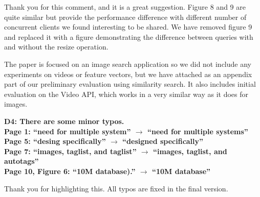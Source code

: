 \documentclass[11pt]{proposalnsf}
\begin{document}
Thank you for this comment, and it is a great suggestion.
Figure 8 and 9 are quite similar but provide the performance difference with different
number of concurrent clients we found interesting to be shared.
We have removed figure 9 and replaced it with a figure
demonstrating the difference between queries with and without the resize operation.

The paper is focused on an image search application so we did not include any
experiments on videos or feature vectors, but we have attached as an appendix
part of our preliminary evaluation using similarity search.
It also includes initial evaluation on the Video API, which works in a very
similar way as it does for images.

\bigskip
\noindent %
\textbf{
D4: There are some minor typos.\\
Page 1: “need for multiple system” $\rightarrow$  “need for multiple systems”\\
Page 5: “desing specifically” $\rightarrow$ “designed specifically”\\
Page 7: “images, taglist, and taglist” $\rightarrow$ “images, taglist, and autotags”\\
Page 10, Figure 6: “10M database).” $\rightarrow$ “10M database”
}\bigskip

Thank you for highlighting this. All typos are fixed in the final version.

\end{document}
